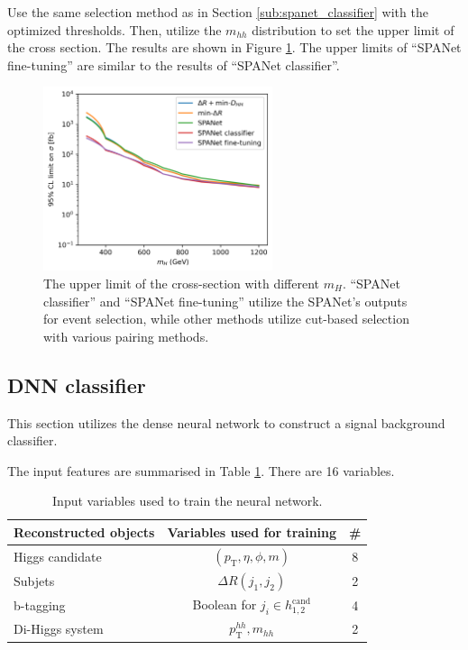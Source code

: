 \documentclass[12pt]{article}
\begin{document}
		Use the same selection method as in Section \ref{sub:spanet_classifier} with the optimized thresholds. Then, utilize the $m_{hh}$ distribution to set the upper limit of the cross section. The results are shown in Figure \ref{fig:CL_limit_SPANET_fine_tuning}. The upper limits of ``SPANet fine-tuning'' are similar to the results of ``SPANet classifier''.
		\begin{figure}[htpb]
			\centering
			\includegraphics[width=0.6\textwidth]{CLs_upper_limit_SPANET_fine_tuning.png}
			\caption{The upper limit of the cross-section with different $m_H$. ``SPANet classifier'' and ``SPANet fine-tuning'' utilize the SPANet's outputs for event selection, while other methods utilize cut-based selection with various pairing methods.}
			\label{fig:CL_limit_SPANET_fine_tuning}
		\end{figure}

	\subsection{DNN classifier}%
	\label{sub:dnn_classifier}
		This section utilizes the dense neural network to construct a signal background classifier.

		The input features are summarised in Table \ref{tab:DNN_variables}. There are 16 variables.
		\begin{table}[htpb]
			\centering
			\caption{Input variables used to train the neural network.}
			\label{tab:DNN_variables}
			\begin{tabular}{l|c|c}
				Reconstructed objects       & Variables used for training   & \# \\ \hline
				Higgs candidate             & $(p_\text{T}, \eta, \phi, m)$ & 8  \\
				Subjets                     & $\Delta R(j_1,j_2)$                    & 2  \\
				b-tagging                   & Boolean for $j_i \in h_{1,2}^{\text{cand}}$       & 4  \\
				Di-Higgs system             & $p_\text{T}^{hh}, m_{hh}$        & 2 
			\end{tabular}		
		\end{table}
\end{document}
